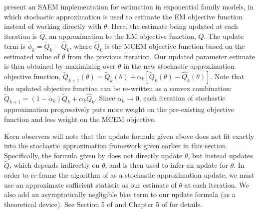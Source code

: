\documentclass[ss]{imsart}
\theoremstyle{plain}
\theoremstyle{definition}
\theoremstyle{remark}
\begin{document}
\citet{Del99} present an SAEM implementation for estimation in exponential family models, in which stochastic approximation is used to estimate the EM objective function instead of working directly with $\theta$. Here, the estimate being updated at each iteration is $\tilde{Q}$, an approximation to the EM objective function, $Q$. The update term is $\hat{\phi}_k = \tilde{Q}_k - \hat{Q}_k$, where $\hat{Q}_k$ is the MCEM objective function based on the estimated value of $\theta$ from the previous iteration. Our updated parameter estimate is then obtained by maximizing over $\theta$ in the new stochastic approximation objective function, $\tilde{Q}_{k+1}(\theta) = \tilde{Q}_k(\theta) + \alpha_k [ \tilde{Q}_k(\theta) - \hat{Q}_k(\theta)]$. Note that the updated objective function can be re-written as a convex combination: $\tilde{Q}_{k+1} = (1 - \alpha_k) \tilde{Q}_k + \alpha_k \hat{Q}_k$. Since $\alpha_k \rightarrow 0$, each iteration of stochastic approximation progressively puts more weight on the pre-existing objective function and less weight on the MCEM objective.

Keen observers will note that the update formula given above does not fit exactly into the stochastic approximation framework given earlier in this section. Specifically, the formula given by \citet{Del99} does not directly update $\theta$, but instead updates $\tilde{Q}$, which depends indirectly on $\theta$, and is then used to infer an update for $\theta$. In order to re-frame the algorithm of \citeauthor{Del99} as a stochastic approximation update, we must use an approximate sufficient statistic as our estimate of $\theta$ at each iteration. We also add an asymptotically negligible bias term to our update formula (as a theoretical device). See Section 5 of \citet{Del99} and Chapter 5 of \citet{Kus03} for details.

\end{document}

